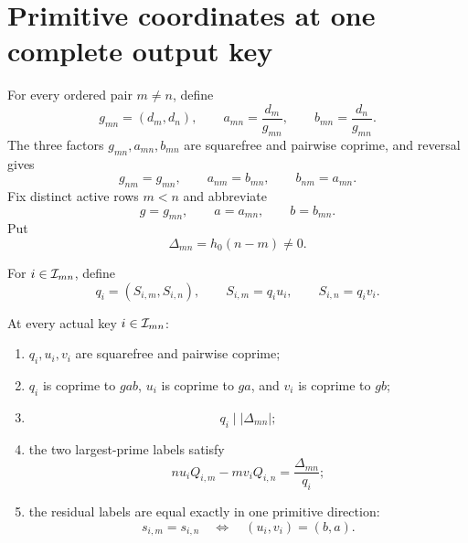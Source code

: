 \section{Primitive coordinates at one complete output key}
\label{sec:primitive-coordinates}

For every ordered pair \(m\ne n\), define
\begin{equation}
 g_{mn}=(d_m,d_n),\qquad
 a_{mn}=\frac{d_m}{g_{mn}},\qquad
 b_{mn}=\frac{d_n}{g_{mn}}.
 \label{eq:row-divisor-split}
\end{equation}
The three factors \(g_{mn},a_{mn},b_{mn}\) are squarefree and pairwise
coprime, and reversal gives
\[
 g_{nm}=g_{mn},\qquad a_{nm}=b_{mn},\qquad b_{nm}=a_{mn}.
\]
Fix distinct active rows \(m<n\) and abbreviate
\[
 g=g_{mn},\qquad a=a_{mn},\qquad b=b_{mn}.
\]
Put
\[
 \Delta_{mn}=h_0(n-m)\ne0.
\]

\begin{definition}
\label{def:direct-entry-coordinates}
For \(i\in\mathcal I_{mn}\), define
\begin{equation}
 q_i=(S_{i,m},S_{i,n}),
 \qquad
 S_{i,m}=q_i u_i,
 \qquad
 S_{i,n}=q_i v_i.
 \label{eq:direct-entry-coordinates}
\end{equation}
\end{definition}

\begin{theorem}
\label{thm:canonical-primitive-key}
At every actual key \(i\in\mathcal I_{mn}\):
\begin{enumerate}[label=\textup{(\roman*)},leftmargin=3em]
 \item \(q_i,u_i,v_i\) are squarefree and pairwise coprime;
 \item \(q_i\) is coprime to \(gab\), \(u_i\) is coprime to \(ga\), and
       \(v_i\) is coprime to \(gb\);
 \item
       \begin{equation}
       \boxed{q_i\mid |\Delta_{mn}|;}
       \label{eq:direct-q-divides-Delta}
       \end{equation}
 \item the two largest-prime labels satisfy
       \begin{equation}
       \boxed{
       n u_i Q_{i,m}-m v_iQ_{i,n}=\frac{\Delta_{mn}}{q_i};}
       \label{eq:direct-prime-line}
       \end{equation}
 \item the residual labels are equal exactly in one primitive direction:
       \begin{equation}
       \boxed{
       s_{i,m}=s_{i,n}
       \quad\Longleftrightarrow\quad
       (u_i,v_i)=(b,a).}
       \label{eq:unique-residual-direction}
       \end{equation}
\end{enumerate}
\end{theorem}

